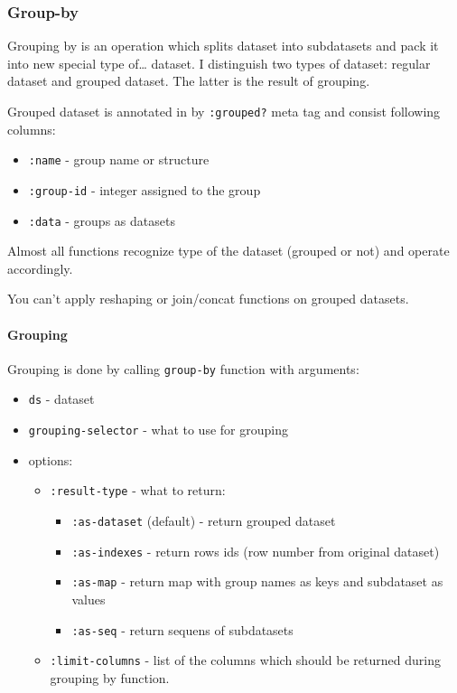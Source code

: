 \documentclass[]{article}
\providecommand{\tightlist}{%
  \setlength{\itemsep}{0pt}\setlength{\parskip}{0pt}}
\let\oldparagraph\paragraph
\renewcommand{\paragraph}[1]{\oldparagraph{#1}\mbox{}}
\begin{document}
\subsubsection{Group-by}\label{group-by}

Grouping by is an operation which splits dataset into subdatasets and
pack it into new special type of\ldots{} dataset. I distinguish two
types of dataset: regular dataset and grouped dataset. The latter is the
result of grouping.

Grouped dataset is annotated in by \texttt{:grouped?} meta tag and
consist following columns:

\begin{itemize}
\tightlist
\item
  \texttt{:name} - group name or structure
\item
  \texttt{:group-id} - integer assigned to the group
\item
  \texttt{:data} - groups as datasets
\end{itemize}

Almost all functions recognize type of the dataset (grouped or not) and
operate accordingly.

You can't apply reshaping or join/concat functions on grouped datasets.

\paragraph{Grouping}\label{grouping}

Grouping is done by calling \texttt{group-by} function with arguments:

\begin{itemize}
\tightlist
\item
  \texttt{ds} - dataset
\item
  \texttt{grouping-selector} - what to use for grouping
\item
  options:

  \begin{itemize}
  \tightlist
  \item
    \texttt{:result-type} - what to return:

    \begin{itemize}
    \tightlist
    \item
      \texttt{:as-dataset} (default) - return grouped dataset
    \item
      \texttt{:as-indexes} - return rows ids (row number from original
      dataset)
    \item
      \texttt{:as-map} - return map with group names as keys and
      subdataset as values
    \item
      \texttt{:as-seq} - return sequens of subdatasets
    \end{itemize}
  \item
    \texttt{:limit-columns} - list of the columns which should be
    returned during grouping by function.
  \end{itemize}
\end{itemize}
\end{document}
